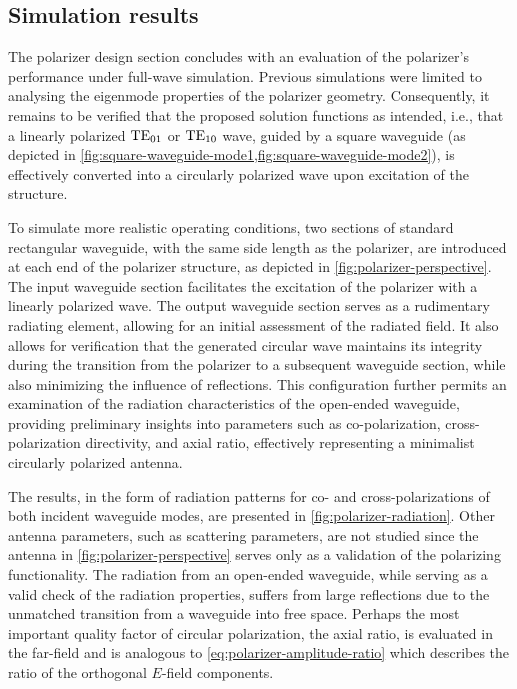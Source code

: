 \documentclass[11pt,a4paper,twoside,openany]{report}
\begin{document}
\subsection{Simulation results}
The polarizer design section concludes with an evaluation of the polarizer's performance under full-wave simulation. Previous simulations were limited to analysing the eigenmode properties of the polarizer geometry. Consequently, it remains to be verified that the proposed solution functions as intended, i.e., that a linearly polarized $\text{TE}_{01}$ or $\text{TE}_{10}$ wave, guided by a square waveguide (as depicted in \cref{fig:square-waveguide-mode1,fig:square-waveguide-mode2}), is effectively converted into a circularly polarized wave upon excitation of the structure.

To simulate more realistic operating conditions, two sections of standard rectangular waveguide, with the same side length as the polarizer, are introduced at each end of the polarizer structure, as depicted in \cref{fig:polarizer-perspective}. The input waveguide section facilitates the excitation of the polarizer with a linearly polarized wave. The output waveguide section serves as a rudimentary radiating element, allowing for an initial assessment of the radiated field. It also allows for verification that the generated circular wave maintains its integrity during the transition from the polarizer to a subsequent waveguide section, while also minimizing the influence of reflections. This configuration further permits an examination of the radiation characteristics of the open-ended waveguide, providing preliminary insights into parameters such as co-polarization, cross-polarization directivity, and axial ratio, effectively representing a minimalist circularly polarized antenna.

The results, in the form of radiation patterns for co- and cross-polarizations of both incident waveguide modes, are presented in \cref{fig:polarizer-radiation}. Other antenna parameters, such as scattering parameters, are not studied since the antenna in \cref{fig:polarizer-perspective} serves only as a validation of the polarizing functionality. The radiation from an open-ended waveguide, while serving as a valid check of the radiation properties, suffers from large reflections due to the unmatched transition from a waveguide into free space. Perhaps the most important quality factor of circular polarization, the axial ratio, is evaluated in the far-field and is analogous to \cref{eq:polarizer-amplitude-ratio} which describes the ratio of the orthogonal $E$-field components.
\end{document}

